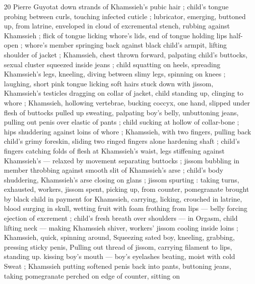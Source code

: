 20 Pierre Guyotat
down strands of Khamssieh’s pubic hair ; child's tongue probing
between curls, touching infected cuticle ; lubricator, emerging,
buttoned up, from latrine, enveloped in cloud of excremental stench,
rubbing against Khamssieh ; flick of tongue licking whore's lids, end
of tongue holding lips half-open ; whore’s member springing back
against black child's armpit, lifting shoulder of jacket ; Khamssieh,
chest thrown forward, palpating child's buttocks, sexual cluster
squeezed inside jeans ; child squatting on heels, spreading
Khamssieh's legs, kneeling, diving between slimy legs, spinning on
knees ; laughing, short pink tongue licking soft hairs stuck down with
jissom, Khamssieh’s testicles dragging on collar of jacket, child
standing up, clinging to whore ; Khamssieh, hollowing vertebrae,
bucking coccyx, one hand, slipped under flesh of buttocks pulled up
sweating, palpating boy's belly, unbuttoning jeans, pulling out penis
over elastic of pants ; child sucking at hollow of collar-bone ; hips
shuddering against loins of whore ; Khamssieh, with two fingers,
pulling back child's grimy foreskin, sliding two ringed fingers alone
hardening shaft ; child's fingers catching folds of flesh at
Khamssieh's waist, legs stiffening against Khamssieh's — relaxed by
movement separating buttocks ; jissom bubbling in member
throbbing against smooth slit of Khamssieh's arse ; child's body
shuddering, Khamssieh's arse closing on glans ; jissom spurting :
taking turns, exhausted, workers, jissom spent, picking up, from
counter, pomegranate brought by black child in payment for
Khamssieh, carrying, licking, crouched in latrine, blood surging in
skull, wetting fruit with foam frothing from lips — belly forcing
ejection of excrement ; child's fresh breath over shoulders — in
Orgasm, child lifting neck — making Khamssieh shiver, workers’
jissom cooling inside loins ; Khamssieh, quick, spinning around,
Squeezing sated boy, kneeling, grabbing, pressing sticky penis,
Pulling out thread of jissom, carrying filament to lips, standing up.
kissing boy's mouth — boy’s eyelashes beating, moist with cold
Sweat ; Khamssieh putting softened penis back into pants, buttoning
jeans, taking pomegranate perched on edge of counter, sitting on

